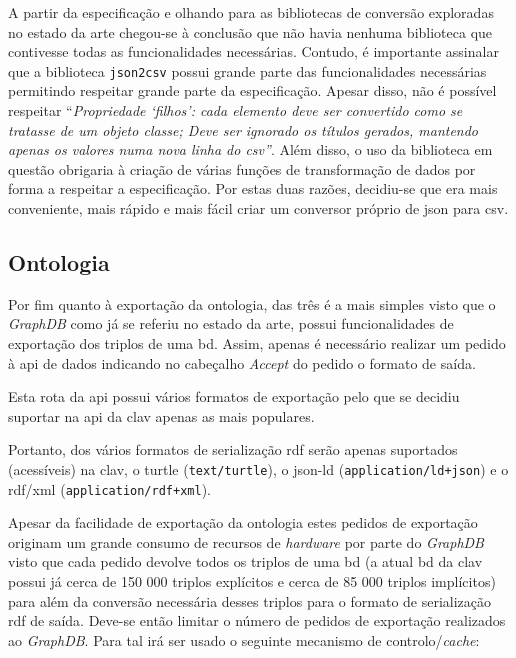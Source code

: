 A partir da especificação e olhando para as bibliotecas de conversão exploradas no estado da arte chegou-se à conclusão que não havia nenhuma biblioteca que contivesse todas as funcionalidades necessárias. Contudo, é importante assinalar que a biblioteca \texttt{json2csv} possui grande parte das funcionalidades necessárias permitindo respeitar grande parte da especificação. Apesar disso, não é possível respeitar ``\textit{Propriedade `filhos': cada elemento deve ser convertido como se tratasse de um objeto classe; Deve ser ignorado os títulos gerados, mantendo apenas os valores numa nova linha do \acrshort{csv}''}. Além disso, o uso da biblioteca em questão obrigaria à criação de várias funções de transformação de dados por forma a respeitar a especificação. Por estas duas razões, decidiu-se que era mais conveniente, mais rápido e mais fácil criar um conversor próprio de \acrshort{json} para \acrshort{csv}.

\subsection{Ontologia}

Por fim quanto à exportação da ontologia, das três é a mais simples visto que o \textit{GraphDB} como já se referiu no estado da arte, possui funcionalidades de exportação dos triplos de uma \acrshort{bd}. Assim, apenas é necessário realizar um pedido à \acrshort{api} de dados indicando no cabeçalho \textit{Accept} do pedido o formato de saída.

Esta rota da \acrshort{api} possui vários formatos de exportação pelo que se decidiu suportar na \acrshort{api} da \acrshort{clav} apenas as mais populares.

Portanto, dos vários formatos de serialização \acrshort{rdf} serão apenas suportados (acessíveis) na \acrshort{clav}, o \acrshort{turtle} (\texttt{text/turtle}), o \acrshort{json-ld} (\texttt{application/ld+json}) e o \acrshort{rdf}/\acrshort{xml} (\texttt{application/rdf+xml}).

Apesar da facilidade de exportação da ontologia estes pedidos de exportação originam um grande consumo de recursos de \textit{hardware} por parte do \textit{GraphDB} visto que cada pedido devolve todos os triplos de uma \acrshort{bd} (a atual \acrshort{bd} da \acrshort{clav} possui já cerca de 150 000 triplos explícitos e cerca de 85 000 triplos implícitos) para além da conversão necessária desses triplos para o formato de serialização \acrshort{rdf} de saída. Deve-se então limitar o número de pedidos de exportação realizados ao \textit{GraphDB}. Para tal irá ser usado o seguinte mecanismo de controlo/\textit{cache}:\label{sec:expOntCache}

